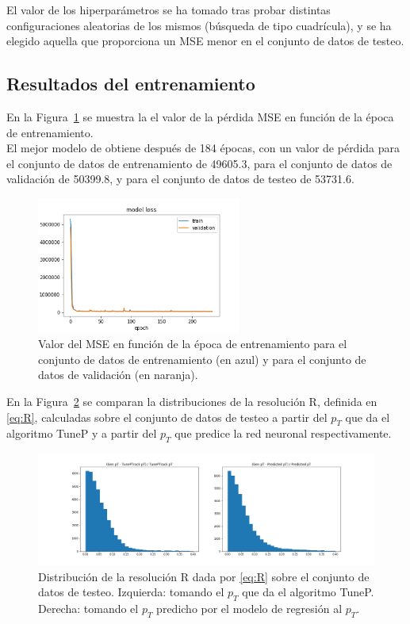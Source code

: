 El valor de los hiperpar\'ametros se ha tomado tras probar distintas configuraciones aleatorias de los mismos (b\'usqueda de tipo cuadr\'icula), y se ha elegido aquella que proporciona un MSE menor en el conjunto de datos de testeo.
  

\subsection{Resultados del entrenamiento}\label{sec:trainresults}

En la Figura~\ref{fig:model_loss} se muestra la el valor de la p\'erdida MSE en funci\'on de la \'epoca de entrenamiento. \\
El mejor modelo de obtiene despu\'es de 184 \'epocas, con un valor de p\'erdida para el conjunto de datos de entrenamiento de 49605.3, para el conjunto de datos de validaci\'on de 50399.8, y para el conjunto de datos de testeo de 53731.6.  \\

\begin{figure}[h]
\centering
\includegraphics[width=0.6\textwidth]{figures/model_loss.png}
\caption{Valor del MSE en funci\'on de la \'epoca de entrenamiento para el conjunto de datos de entrenamiento (en azul) y para el conjunto de datos de validaci\'on (en naranja).}
\label{fig:model_loss}        
\end{figure}


En la Figura~\ref{fig:R_predicted} se comparan la distribuciones de la resoluci\'on R, definida en \eqref{eq:R}, calculadas sobre el conjunto de datos de testeo a partir del $p_{T}$ que da el algoritmo TuneP y a partir del $p_{T}$ que predice la red neuronal respectivamente.

\begin{figure}[h]
\centering
\includegraphics[width=1.0\textwidth]{figures/R_predicted.png}
\caption{Distribuci\'on de la resoluci\'on R dada por \eqref{eq:R} sobre el conjunto de datos de testeo. Izquierda: tomando el $p_{T}$ que da el algoritmo TuneP. Derecha: tomando el $p_{T}$ predicho por el modelo de regresi\'on al $p_{T}$.}
\label{fig:R_predicted}        
\end{figure}

